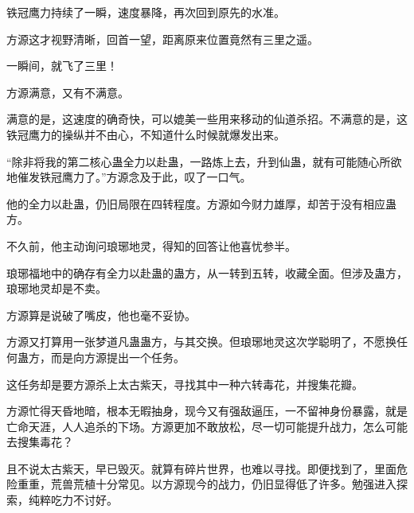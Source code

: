 \begin{this_body}
铁冠鹰力持续了一瞬，速度暴降，再次回到原先的水准。

方源这才视野清晰，回首一望，距离原来位置竟然有三里之遥。

一瞬间，就飞了三里！

方源满意，又有不满意。

满意的是，这速度的确奇快，可以媲美一些用来移动的仙道杀招。不满意的是，这铁冠鹰力的操纵并不由心，不知道什么时候就爆发出来。

“除非将我的第二核心蛊全力以赴蛊，一路炼上去，升到仙蛊，就有可能随心所欲地催发铁冠鹰力了。”方源念及于此，叹了一口气。

他的全力以赴蛊，仍旧局限在四转程度。方源如今财力雄厚，却苦于没有相应蛊方。

不久前，他主动询问琅琊地灵，得知的回答让他喜忧参半。

琅琊福地中的确存有全力以赴蛊的蛊方，从一转到五转，收藏全面。但涉及蛊方，琅琊地灵却是不卖。

方源算是说破了嘴皮，他也毫不妥协。

方源又打算用一张梦道凡蛊蛊方，与其交换。但琅琊地灵这次学聪明了，不愿换任何蛊方，而是向方源提出一个任务。

这任务却是要方源杀上太古紫天，寻找其中一种六转毒花，并搜集花瓣。

方源忙得天昏地暗，根本无暇抽身，现今又有强敌逼压，一不留神身份暴露，就是亡命天涯，人人追杀的下场。方源更加不敢放松，尽一切可能提升战力，怎么可能去搜集毒花？

且不说太古紫天，早已毁灭。就算有碎片世界，也难以寻找。即便找到了，里面危险重重，荒兽荒植十分常见。以方源现今的战力，仍旧显得低了许多。勉强进入探索，纯粹吃力不讨好。

\end{this_body}

